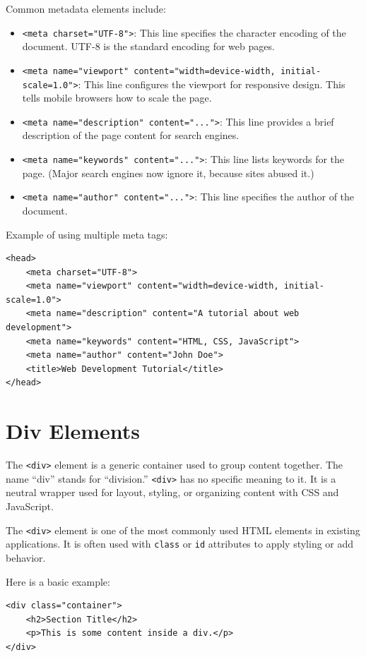 Common metadata elements include:

\begin{itemize}
    \item \verb|<meta charset="UTF-8">|: This line specifies the character encoding of the document.
      UTF-8 is the standard encoding for web pages.
    \item \verb|<meta name="viewport" content="width=device-width, initial-scale=1.0">|:
      This line configures the viewport for responsive design. This tells mobile browsers how
      to scale the page.
    \item \verb|<meta name="description" content="...">|: This line provides a brief description
      of the page content for search engines.
    \item \verb|<meta name="keywords" content="...">|: This line lists keywords for the page. (Major search engines now ignore it, because sites abused it.)
    \item \verb|<meta name="author" content="...">|: This line specifies the author of the document.
\end{itemize}

Example of using multiple meta tags:

\begin{verbatim}
<head>
    <meta charset="UTF-8">
    <meta name="viewport" content="width=device-width, initial-scale=1.0">
    <meta name="description" content="A tutorial about web development">
    <meta name="keywords" content="HTML, CSS, JavaScript">
    <meta name="author" content="John Doe">
    <title>Web Development Tutorial</title>
</head>
\end{verbatim}

\section{Div Elements}
The \verb|<div>| element is a generic container used to group content together. The name
``div'' stands for ``division.''
\verb|<div>| has no specific meaning to it. It is a neutral wrapper used for layout,
styling, or organizing content with CSS and JavaScript.

The \verb|<div>| element is one of the most commonly used HTML elements in existing applications. It is often
used with \verb|class| or \verb|id| attributes to apply styling or add behavior.

Here is a basic example:

\begin{verbatim}
<div class="container">
    <h2>Section Title</h2>
    <p>This is some content inside a div.</p>
</div>
\end{verbatim}

